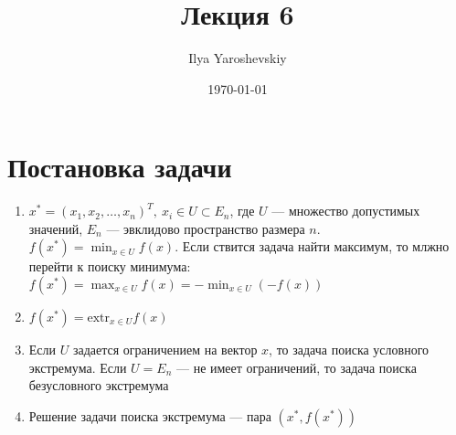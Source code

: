 \documentclass[english]{article}
\author{Ilya Yaroshevskiy}
\date{\today}
\title{Лекция 6}
\theoremstyle{plain}
\theoremstyle{remark}
\theoremstyle{definition}
\begin{document}
\maketitle
\tableofcontents


\section{Постановка задачи}
\label{sec:org78379d9}
\begin{enumerate}
\item \(x^* = (x_1, x_2, \dots, x_n)^T,\ x_i \in U \subset E_n\), где \(U\) --- множество допустимых значений, \(E_n\) --- эвклидово
пространство размера \(n\). \(f(x^*) = \min_{x \in U} f(x)\). Если
ствится задача найти максимум, то млжно перейти к поиску минимума: \(f(x^*) = \max_{x\in U}f(x) = -\min_{x \in U}(-f(x))\)
\item \(f(x^*) = \text{extr}_{x \in U}f(x)\)
\item Если \(U\) задается ограничением на вектор \(x\), то задача поиска
условного экстремума. Если \(U = E_n\) --- не имеет ограничений,
то задача поиска безусловного экстремума
\item Решение задачи поиска экстремума --- пара \((x^*, f(x^*))\)
\end{enumerate}
\end{document}
